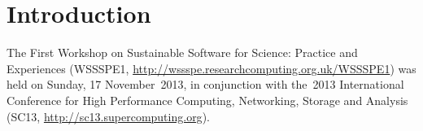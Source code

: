 \documentclass[11pt, oneside]{amsart}
\newcommand{\todo}[1]{{\color{blue}$\blacksquare$~\textsf{[TODO: #1]}}}
\begin{document}
\begin{comment}
The original document is
\url{https://docs.google.com/document/d/1eVfioGNlihXG_1Y8BgdCI6tXZKrybZgz5XuQHjT1oKU/edit?pli=1#}
(but can no longer be edited).  Note that the original document has
comments in addition to text.
\end{comment}

%
%
%

\section{Introduction}

The First Workshop on Sustainable Software for Science: Practice and
Experiences (WSSSPE1,
\url{http://wssspe.researchcomputing.org.uk/WSSSPE1}) was held on
Sunday, 17 November~2013, in conjunction with the~2013 International
Conference for High Performance Computing, Networking, Storage and
Analysis (SC13, \url{http://sc13.supercomputing.org}).
\end{document}

